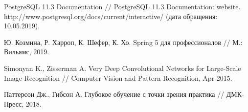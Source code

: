 \begin{thebibliography}{00}
    PostgreSQL 11.3 Documentation // 
    PostgreSQL 11.3 Documentation: website. 
    http://www.postgresql.org/docs/current/interactive/
    (дата обращения: 10.05.2019).

    Ю. Козмина, Р. Харроп, К. Шефер, К. Хо. 
    Spring 5 для профессионалов //
    М.: Вильямс, 
    2019.

    Simonyan K., Zisserman A. 
    Very Deep Convolutional Networks for Large-Scale Image Recognition // 
    Computer Vision and Pattern Recognition, 
    Apr 2015.

    Паттерсон Дж., Гибсон А. 
    Глубокое обучение с точки зрения практика //
    ДМК-Пресс, 
    2018.

\end{thebibliography}
\endgroup

\clearpage